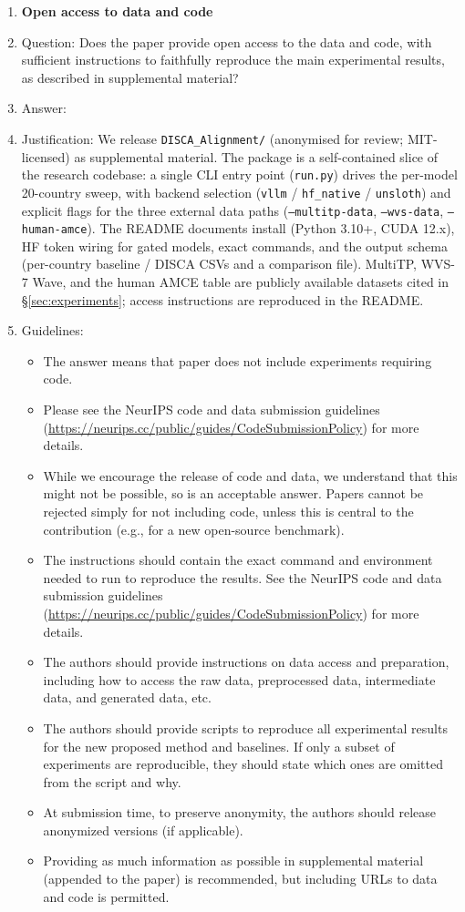 \begin{enumerate}
\item {\bf Open access to data and code}
    \item[] Question: Does the paper provide open access to the data and code, with sufficient instructions to faithfully reproduce the main experimental results, as described in supplemental material?
    \item[] Answer: \answerYes{}
    \item[] Justification: We release \texttt{DISCA\_Alignment/} (anonymised for review; MIT-licensed) as supplemental material. The package is a self-contained slice of the research codebase: a single CLI entry point (\texttt{run.py}) drives the per-model 20-country sweep, with backend selection (\texttt{vllm} / \texttt{hf\_native} / \texttt{unsloth}) and explicit flags for the three external data paths (\texttt{--multitp-data}, \texttt{--wvs-data}, \texttt{--human-amce}). The README documents install (Python 3.10+, CUDA 12.x), HF token wiring for gated models, exact commands, and the output schema (per-country baseline / DISCA CSVs and a comparison file). MultiTP, WVS-7 Wave, and the human AMCE table are publicly available datasets cited in \S\ref{sec:experiments}; access instructions are reproduced in the README.
    \item[] Guidelines:
    \begin{itemize}
        \item The answer \answerNA{} means that paper does not include experiments requiring code.
        \item Please see the NeurIPS code and data submission guidelines (\url{https://neurips.cc/public/guides/CodeSubmissionPolicy}) for more details.
        \item While we encourage the release of code and data, we understand that this might not be possible, so \answerNo{} is an acceptable answer. Papers cannot be rejected simply for not including code, unless this is central to the contribution (e.g., for a new open-source benchmark).
        \item The instructions should contain the exact command and environment needed to run to reproduce the results. See the NeurIPS code and data submission guidelines (\url{https://neurips.cc/public/guides/CodeSubmissionPolicy}) for more details.
        \item The authors should provide instructions on data access and preparation, including how to access the raw data, preprocessed data, intermediate data, and generated data, etc.
        \item The authors should provide scripts to reproduce all experimental results for the new proposed method and baselines. If only a subset of experiments are reproducible, they should state which ones are omitted from the script and why.
        \item At submission time, to preserve anonymity, the authors should release anonymized versions (if applicable).
        \item Providing as much information as possible in supplemental material (appended to the paper) is recommended, but including URLs to data and code is permitted.
    \end{itemize}



\end{enumerate}

